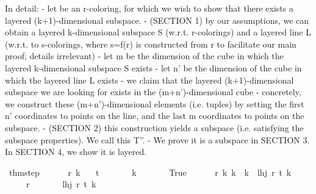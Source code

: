 \begin{isabellebody}
\begin{isamarkuptext}
In detail:
  - let \isa{{\isasymchi}} be an r-coloring, for which we wish to show that there exists a layered (k+1)-dimensional subspace.
  - (SECTION 1) by our assumptions, we can obtain a layered k-dimensional subspace S (w.r.t. r-colorings) and a layered line L (w.r.t. to s-colorings, where s=f(r) is constructed from r to facilitate our main proof; details irrelevant)
  - let m be the dimension of the cube in which the layered k-dimensional subspace S exists
  - let n' be the dimension of the cube in which the layered line L exists
  - we claim that the layered (k+1)-dimensional subspace we are looking for exists in the (m+n')-dimensional cube
    - concretely, we construct these (m+n')-dimensional elements (i.e. tuples) by setting the first n' coordinates to points on the line, and the last m coordinates to points on the subspace.
    - (SECTION 2) this construction yields a subspace (i.e. satisfying the subspace properties). We call this T''. 
    -  We prove it is a subspace in SECTION 3. In SECTION 4, we show it is layered.%
\end{isamarkuptext}\isamarkuptrue%
\isamarkupfalse%
\ thm{}{\isacharunderscore}{\kern0pt}step{\isacharcolon}{\kern0pt}\ \isanewline
\ \ \ \ \ r\ k\isanewline
\ \ \ {\isachardoublequoteopen}t\ {\isachargreater}{\kern0pt}\ {}{\isachardoublequoteclose}\isanewline
\ \ \ \ \ {\isachardoublequoteopen}k\ {\isasymge}\ {}{\isachardoublequoteclose}\isanewline
\ \ \ \ \ {\isachardoublequoteopen}True{\isachardoublequoteclose}\ \isanewline
\ \ \ \ \ {\isachardoublequoteopen}{\isacharparenleft}{\kern0pt}{\isasymAnd}r\ k{\isacharprime}{\kern0pt}{\isachardot}{\kern0pt}\ k{\isacharprime}{\kern0pt}\ {\isasymle}\ k\ {\isasymLongrightarrow}\ lhj\ r\ t\ k{\isacharprime}{\kern0pt}{\isacharparenright}{\kern0pt}{\isachardoublequoteclose}\ \isanewline
\ \ \ \ \ {\isachardoublequoteopen}r\ {\isachargreater}{\kern0pt}\ {}{\isachardoublequoteclose}\isanewline
\ \ \ \ \ {\isachardoublequoteopen}lhj\ r\ t\ {\isacharparenleft}{\kern0pt}k{\isacharplus}{\kern0pt}{}{\isacharparenright}{\kern0pt}{\isachardoublequoteclose}\isanewline
%
\isadelimproof
%
\endisadelimproof
%
\isatagproof
{}\isamarkupfalse%
{\isacharminus}{\kern0pt}\isanewline
\ \ \isamarkupfalse%

\end{isabellebody}
